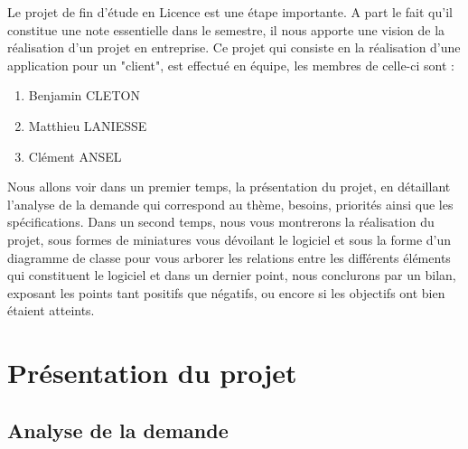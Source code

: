 \documentclass[a4paper,oneside]{article}
\begin{document}
Le projet de fin d'étude en Licence est une étape importante.
A part le fait qu'il constitue une note essentielle dans le semestre,
il nous apporte une vision de la réalisation d'un projet en entreprise.
Ce projet qui consiste en la réalisation d'une application pour un "client", 
est effectué en équipe, les membres de celle-ci sont :
\begin{enumerate}
	\item Benjamin CLETON
	\item Matthieu LANIESSE
	\item Clément ANSEL
\end{enumerate}
Nous allons voir dans un premier temps, la présentation du projet, en détaillant l'analyse de la demande qui correspond au thème, besoins, priorités ainsi que les spécifications.
Dans un second temps, nous vous montrerons la réalisation du projet, sous formes
de miniatures vous dévoilant le logiciel et sous la forme d'un diagramme de classe pour vous arborer les relations entre les différents éléments qui constituent le logiciel et dans un dernier point, nous conclurons par un bilan, exposant les points tant positifs que négatifs, ou encore si les objectifs ont bien étaient atteints.

\section{Présentation du projet}

\subsection{Analyse de la demande}
\end{document}
